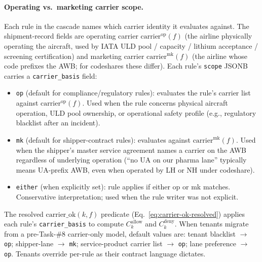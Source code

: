 \documentclass[11pt,a4paper]{article}
\theoremstyle{definition}
\begin{document}
\paragraph{Operating vs.\ marketing carrier scope.}
Each rule in the cascade names which carrier identity it evaluates against. The
shipment-record fields are operating carrier $\text{carrier}^{\text{op}}(f)$ (the
airline physically operating the aircraft, used by IATA ULD pool / capacity / lithium
acceptance / screening certification) and marketing carrier $\text{carrier}^{\text{mk}}(f)$
(the airline whose code prefixes the AWB; for codeshares these differ).
Each rule's \texttt{scope} JSONB carries a \texttt{carrier\_basis} field:
\begin{itemize}[noitemsep]
  \item \texttt{op} (default for compliance/regulatory rules): evaluates the rule's
        carrier list against $\text{carrier}^{\text{op}}(f)$. Used when the rule
        concerns physical aircraft operation, ULD pool ownership, or operational
        safety profile (e.g., regulatory blacklist after an incident).
  \item \texttt{mk} (default for shipper-contract rules): evaluates against
        $\text{carrier}^{\text{mk}}(f)$. Used when the shipper's master service
        agreement names a carrier on the AWB regardless of underlying operation
        (``no UA on our pharma lane'' typically means UA-prefix AWB, even when
        operated by LH or NH under codeshare).
  \item \texttt{either} (when explicitly set): rule applies if either op or mk
        matches. Conservative interpretation; used when the rule writer was not
        explicit.
\end{itemize}
The resolved $\text{carrier\_ok}(k, f)$ predicate (Eq.~\ref{eq:carrier-ok-resolved})
applies each rule's \texttt{carrier\_basis} to compute $C_k^{\text{allow}}$ and
$C_k^{\text{deny}}$. When tenants migrate from a pre-Task-\#8 carrier-only model,
default values are: tenant blacklist $\to$ \texttt{op}; shipper-lane $\to$
\texttt{mk}; service-product carrier list $\to$ \texttt{op}; lane preference $\to$
\texttt{op}. Tenants override per-rule as their contract language dictates.
\end{document}
